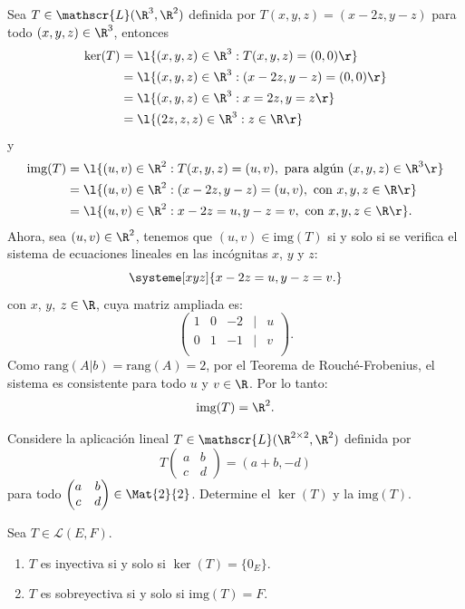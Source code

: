 \documentclass[compacto,10pt]{pubciencias-notas}
\begin{document}
\begin{ejem}\hspace{0pt}\label{AplicacionLineal}
Sea $T\in \mathscr{L}(\R^3,\R^2)$ definida por $T(x,y,z) = (x-2z,y-z)$ para todo $(x,y,z)\in\R^{3}$, entonces
\begin{align*}
 \ker(T) &= \l\{(x,y,z)\in \R^3:T(x,y,z)=(0,0)\r\}\\
 &= \l\{(x,y,z)\in \R^3:(x-2z,y-z)=(0,0)\r\}\\
 &=\l\{(x,y,z)\in \R^3:x=2z, y=z\r\}\\
 &=\l\{(2z,z,z)\in \R^3:z\in\R\r\}
\end{align*}
y
\begin{align*}
    \text{img}(T) &= \l\{(u,v)\in \R^2: T(x,y,z)=(u,v), \text{ para algún } (x,y,z)\in\R^{3}\r\}\\
    &= \l\{(u,v)\in \R^2: (x-2z,y-z)=(u,v), \text{ con }x,y,z\in\R\r\}\\
    &= \l\{(u,v)\in \R^2: x-2z=u, y-z=v, \text{ con }x,y,z\in\R\r\}.
\end{align*}
Ahora, sea $(u,v)\in\R^{2}$, tenemos que $(u,v)\in\text{img}(T)$ si y solo si se verifica el sistema de ecuaciones lineales en las incógnitas $x$, $y$ y $z$:
\[
\systeme[xyz]{x-2z=u,y-z=v.}
\]
con $x$, $y$, $z\in\R$, cuya matriz ampliada es:
\[
    \begin{pmatrix}
    1&0&-2&|&u\\
    0&1&-1&|&v\\
    \end{pmatrix}.
\]
Como $\text{rang}(A|b)=\text{rang}(A)=2$, por el Teorema de Rouché-Frobenius, el sistema es consistente para todo $u$ y $v\in\R$. Por lo tanto:
\[
    \text{img}(T)= \R^{2}.
\]
\end{ejem}

\begin{ejer}
Considere la aplicación lineal $T\in \mathscr{L}(\R^{2\times 2},\R^2)$ definida por 
\[
    T\begin{pmatrix}a&b\\c&d\end{pmatrix}=(a+b,-d)
\]
para todo $\begin{pmatrix}a&b\\c&d\end{pmatrix}\in\Mat{2}{2}$. Determine el $\ker(T)$ y la $\text{img}(T)$.
\end{ejer}

\begin{prop}
Sea $T \in \mathscr{L}(E,F)$.
\begin{enumerate}
\item $T$ es inyectiva si y solo si $\ker(T)=\{0_{E}\}$.
\item $T$ es sobreyectiva si y solo si $\text{img}(T)=F$.
\end{enumerate}
\end{prop}
\end{document}
